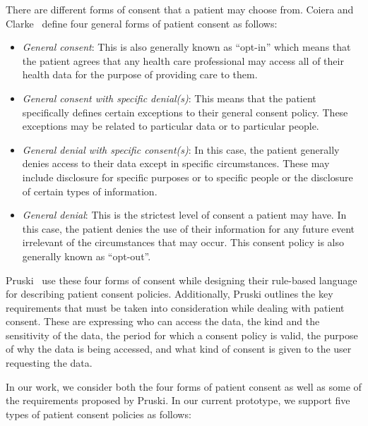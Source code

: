 \documentclass[conference]{IEEEtran}
\begin{document}
There are different forms of consent that a patient may choose from. Coiera and Clarke~\cite{coiera2004consent} define four general forms of patient consent as
follows:

\begin{itemize}
 \item \textit{General consent}: This is also generally known as ``opt-in'' which means that the patient agrees that any health care professional may access
all of their health data for the purpose of providing care to them.
\item \textit{General consent with specific denial(s)}: This means that the patient specifically defines certain exceptions to their general consent policy.
These exceptions may be related to particular data or to particular people.
\item \textit{General denial with specific consent(s)}: In this case, the patient generally denies access to their data except in specific circumstances. These
may include disclosure for specific purposes or to specific people or the disclosure of certain types of information.
\item \textit{General denial}: This is the strictest level of consent a patient may have. In this case, the patient denies the use of their information for any
future event irrelevant of the circumstances that may occur. This consent policy is also generally known as ``opt-out''.
\end{itemize}

Pruski~\cite{pruski2010} use these four forms of consent while designing their rule-based language for describing patient consent policies. Additionally,
Pruski outlines the key requirements that must be taken into consideration while dealing with patient consent. These are expressing who can access the data,
the kind and the sensitivity of the data, the period for which a consent policy is valid, the purpose of why the data is being accessed, and what kind of
consent is given to the user requesting the data. 

In our work, we consider both the four forms of patient consent as well as some of the requirements proposed by Pruski. In our current prototype, we support
five types of patient consent policies as follows:
\end{document}
